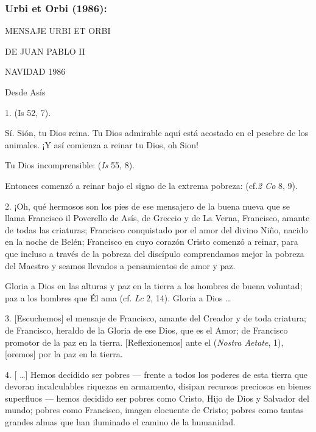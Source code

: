 \begin{body}
	\subsubsection{Urbi et Orbi (1986):}

	MENSAJE URBI ET ORBI

	DE JUAN PABLO II

	NAVIDAD 1986

	Desde Asís

	\begin{body}
		1.  (Is 52, 7).

		Sí. Sión, tu Dios reina. Tu Dios admirable aquí está acostado en el pesebre de los animales. ¡Y así comienza a reinar tu Dios, oh Sion!

		Tu Dios incomprensible:  (\emph{Is} 55, 8).

		Entonces comenzó a reinar bajo el signo de la extrema pobreza:  (cf.\emph{2 Co} 8, 9).

		2. ¡Oh, qué hermosos son los pies de ese mensajero de la buena nueva que se llama Francisco il Poverello de Asís, de Greccio y de La Verna, Francisco, amante de todas las criaturas; Francisco conquistado por el amor del divino Niño, nacido en la noche de Belén; Francisco en cuyo corazón Cristo comenzó a reinar, para que incluso a través de la pobreza del discípulo comprendamos mejor la pobreza del Maestro y seamos llevados a pensamientos de amor y paz.

		Gloria a Dios en las alturas y paz en la tierra a los hombres de buena voluntad; paz a los hombres que Él ama (cf. \emph{Lc} 2, 14). Gloria a Dios \ldots{}

		3. {[}Escuchemos{]} el mensaje de Francisco, amante del Creador y de toda criatura; de Francisco, heraldo de la Gloria de ese Dios, que  es el Amor; de Francisco promotor de la paz en la tierra. {[}Reflexionemos{]} ante el  ({\emph{Nostra Aetate}}, 1), {[}oremos{]} por la paz en la tierra.

		4. {[} \ldots{}{]} Hemos decidido ser pobres --- frente a todos los poderes de esta tierra que devoran incalculables riquezas en armamento, disipan recursos preciosos en bienes superfluos --- hemos decidido ser pobres como Cristo, Hijo de Dios y Salvador del mundo; pobres como Francisco, imagen elocuente de Cristo; pobres como tantas grandes almas que han iluminado el camino de la humanidad.


\end{body}
\end{body}
